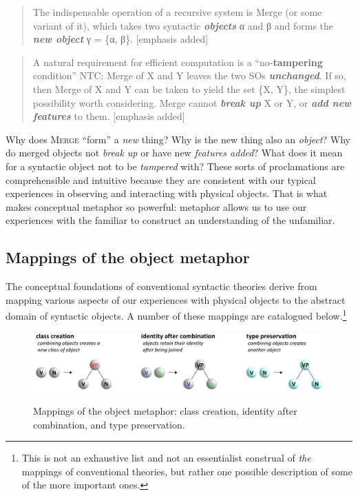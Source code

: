 \begin{quote}
The indispensable operation of a recursive system is Merge (or some variant of it), which takes two syntactic \textbf{\textit{objects}} α and β and forms the \textbf{\textit{new object}} γ = \{α, β\}. \citep[3]{Chomsky2001hale} [emphasis added]
\end{quote}

\begin{quote}
A natural requirement for efficient computation is a “no-\textbf{tampering} condition” NTC: Merge of X and Y leaves the two SOs \textbf{\textit{unchanged}}. If so, then Merge of X and Y can be taken to yield the set \{X, Y\}, the simplest possibility worth considering. Merge cannot \textbf{\textit{break up}} X or Y, or \textbf{\textit{add new features}} to them. \citep[5-6]{Chomsky2008} [emphasis added]
\end{quote}

  Why does \textsc{Merge} “form” a \textit{new} thing? Why is the new thing also an \textit{object}? Why do merged objects not \textit{break up} or have new \textit{features added}? What does it mean for a syntactic object not to be \textit{tampered} with? These sorts of proclamations are comprehensible and  intuitive because they are consistent with our typical experiences in observing and interacting with physical objects. That is what makes conceptual metaphor so powerful: metaphor allows us to use our experiences with the familiar to construct an understanding of the unfamiliar. 

\subsection{Mappings of the object metaphor}

The conceptual foundations of conventional syntactic theories derive from mapping various aspects of our experiences with physical objects to the abstract domain of syntactic objects. A number of these mappings are catalogued below.\footnote{This is not an exhaustive list and not an essentialist construal of \textit{the} mappings of conventional theories, but rather one possible description of some of the more important ones.}

  
\begin{figure}
\includegraphics[width=\textwidth]{figures/Tilsen-img29.png}
\caption{Mappings of the object metaphor: class creation, identity after combination, and type preservation.}
\label{fig:3:1}
\end{figure}
 


